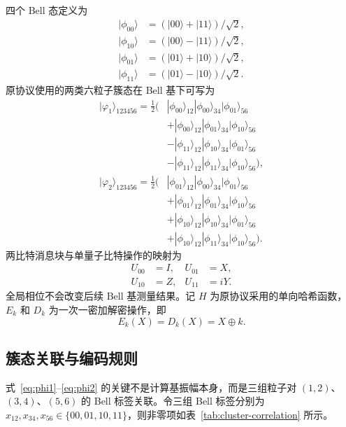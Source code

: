 \documentclass[UTF8,10pt,a4paper]{ctexart}
\theoremstyle{aqdplain}
\begin{document}
四个 Bell 态定义为
\begin{align}
|\phi_{00}\rangle&=(|00\rangle+|11\rangle)/\sqrt{2},\nonumber\\
|\phi_{10}\rangle&=(|00\rangle-|11\rangle)/\sqrt{2},\nonumber\\
|\phi_{01}\rangle&=(|01\rangle+|10\rangle)/\sqrt{2},\nonumber\\
|\phi_{11}\rangle&=(|01\rangle-|10\rangle)/\sqrt{2}.
\label{eq:bell}
\end{align}
原协议使用的两类六粒子簇态在 Bell 基下可写为
\begin{align}
|\varphi_1\rangle_{123456}=\frac{1}{2}\big(&
 |\phi_{00}\rangle_{12}|\phi_{00}\rangle_{34}|\phi_{01}\rangle_{56}\nonumber\\
&+|\phi_{00}\rangle_{12}|\phi_{01}\rangle_{34}|\phi_{10}\rangle_{56}\nonumber\\
&-|\phi_{11}\rangle_{12}|\phi_{10}\rangle_{34}|\phi_{01}\rangle_{56}\nonumber\\
&-|\phi_{11}\rangle_{12}|\phi_{11}\rangle_{34}|\phi_{10}\rangle_{56}\big),
\label{eq:phi1}\\
|\varphi_2\rangle_{123456}=\frac{1}{2}\big(&
 |\phi_{01}\rangle_{12}|\phi_{00}\rangle_{34}|\phi_{01}\rangle_{56}\nonumber\\
&+|\phi_{01}\rangle_{12}|\phi_{01}\rangle_{34}|\phi_{10}\rangle_{56}\nonumber\\
&+|\phi_{10}\rangle_{12}|\phi_{10}\rangle_{34}|\phi_{01}\rangle_{56}\nonumber\\
&+|\phi_{10}\rangle_{12}|\phi_{11}\rangle_{34}|\phi_{10}\rangle_{56}\big).
\label{eq:phi2}
\end{align}
两比特消息块与单量子比特操作的映射为
\begin{align}
U_{00}&=I, & U_{01}&=X,\nonumber\\
U_{10}&=Z, & U_{11}&=iY.
\label{eq:pauli-map}
\end{align}
全局相位不会改变后续 Bell 基测量结果。记 $H$ 为原协议采用的单向哈希函数，$E_k$ 和 $D_k$ 为一次一密加解密操作，即
\begin{equation}
E_k(X)=D_k(X)=X\oplus k.
\label{eq:orig-otp}
\end{equation}

\subsection{簇态关联与编码规则}

式~\eqref{eq:phi1}--\eqref{eq:phi2} 的关键不是计算基振幅本身，而是三组粒子对 $(1,2)$、$(3,4)$、$(5,6)$ 的 Bell 标签关联。令三组 Bell 标签分别为 $x_{12},x_{34},x_{56}\in\{00,01,10,11\}$，则非零项如表~\ref{tab:cluster-correlation} 所示。
\end{document}
